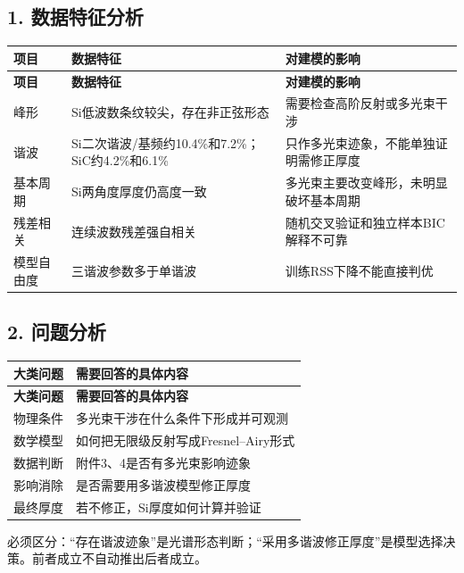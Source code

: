 \documentclass[11pt,a4paper]{ctexart}
\begin{document}
\subsection*{1. 数据特征分析}
\begin{center}
\scriptsize
\begin{longtable}{|>{\raggedright\arraybackslash}p{}|>{\raggedright\arraybackslash}p{}|>{\raggedright\arraybackslash}p{}|}
\hline
\textbf{项目} & \textbf{数据特征} & \textbf{对建模的影响} \\ \hline
\endfirsthead
\hline \textbf{项目} & \textbf{数据特征} & \textbf{对建模的影响} \\ \hline
\endhead
峰形 & Si低波数条纹较尖，存在非正弦形态 & 需要检查高阶反射或多光束干涉 \\ \hline
谐波 & Si二次谐波/基频约10.4\%和7.2\%；SiC约4.2\%和6.1\% & 只作多光束迹象，不能单独证明需修正厚度 \\ \hline
基本周期 & Si两角度厚度仍高度一致 & 多光束主要改变峰形，未明显破坏基本周期 \\ \hline
残差相关 & 连续波数残差强自相关 & 随机交叉验证和独立样本BIC解释不可靠 \\ \hline
模型自由度 & 三谐波参数多于单谐波 & 训练RSS下降不能直接判优 \\ \hline
\end{longtable}
\normalsize
\end{center}
\subsection*{2. 问题分析}
\begin{center}
\scriptsize
\begin{longtable}{|>{\raggedright\arraybackslash}p{}|>{\raggedright\arraybackslash}p{}|}
\hline
\textbf{大类问题} & \textbf{需要回答的具体内容} \\ \hline
\endfirsthead
\hline \textbf{大类问题} & \textbf{需要回答的具体内容} \\ \hline
\endhead
物理条件 & 多光束干涉在什么条件下形成并可观测 \\ \hline
数学模型 & 如何把无限级反射写成Fresnel–Airy形式 \\ \hline
数据判断 & 附件3、4是否有多光束影响迹象 \\ \hline
影响消除 & 是否需要用多谐波模型修正厚度 \\ \hline
最终厚度 & 若不修正，Si厚度如何计算并验证 \\ \hline
\end{longtable}
\normalsize
\end{center}
必须区分：“存在谐波迹象”是光谱形态判断；“采用多谐波修正厚度”是模型选择决策。前者成立不自动推出后者成立。
\end{document}
